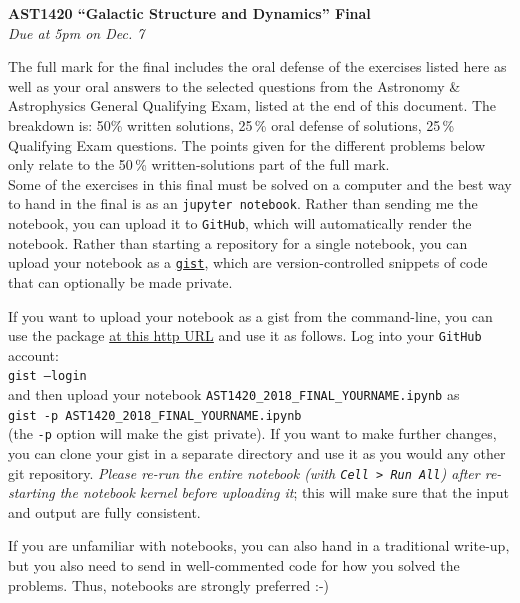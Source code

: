\documentclass[12pt]{article}
\begin{document}
\begin{center}
{\bf \LARGE AST1420 ``Galactic Structure and Dynamics'' Final}\\[7pt]
\emph{Due at 5pm on Dec. 7}\\[7pt]
\end{center}

The full mark for the final includes the oral defense of the exercises
listed here as well as your oral answers to the selected questions
from the Astronomy \& Astrophysics General Qualifying Exam, listed at
the end of this document. The breakdown is: 50\% written solutions,
25\,\% oral defense of solutions, 25\,\% Qualifying Exam
questions. The points given for the different problems below only
relate to the 50\,\% written-solutions part of the full mark.\\

Some of the exercises in this final must be solved on a computer and
the best way to hand in the final is as an \texttt{jupyter
  notebook}. Rather than sending me the notebook, you can upload it to
\texttt{GitHub}, which will automatically render the notebook. Rather
than starting a repository for a single notebook, you can upload your
notebook as a \texttt{\href{https://gist.github.com/}{gist}}, which
are version-controlled snippets of code that can optionally be made
private.

If you want to upload your notebook as a gist from the command-line,
you can use the package \href{http://github.com/defunkt/gist}{at this
  http URL} and use it as follows. Log into your \texttt{GitHub}
account:\\

\texttt{gist --login}\\

and then upload your notebook
\texttt{AST1420\_2018\_FINAL\_YOURNAME.ipynb} as\\

\texttt{gist -p AST1420\_2018\_FINAL\_YOURNAME.ipynb}\\

(the \texttt{-p} option will make the gist private). If you want to
make further changes, you can clone your gist in a separate directory
and use it as you would any other git repository. \emph{Please re-run
  the entire notebook (with \texttt{Cell > Run All}) after re-starting
  the notebook kernel before uploading it}; this will make sure that
the input and output are fully consistent. 

If you are unfamiliar with notebooks, you can also hand in a
traditional write-up, but you also need to send in well-commented code
for how you solved the problems. Thus, notebooks are strongly
preferred :-)\\
\end{document}
